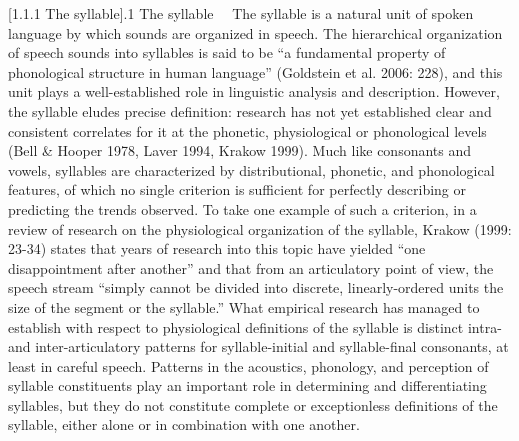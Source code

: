 \documentclass[12pt]{article}
\makeatletter
\renewcommand\section{\@startsection{section}{1}{0.0in}{0in}{0.1mm}{\normalfont\normalsize\fontsize{18pt}{21.6pt}\selectfont\rmfamily\bfseries\upshape\raggedright}}
\newenvironment{styleBody}{\renewcommand\baselinestretch{1.0}\setlength\leftskip{0in}\setlength\rightskip{0in plus 1fil}\setlength\parindent{0in}\setlength\parfillskip{0pt plus 1fil}\setlength\parskip{0in plus 1pt}\writerlistparindent\writerlistleftskip\leavevmode\normalfont\normalsize\fontsize{11pt}{13.2pt}\selectfont\mdseries\upshape\writerlistlabel\ignorespaces}{\unskip\vspace{0in plus 1pt}\par}
\newcommand\writerlistleftskip{}
\newcommand\writerlistparindent{}
\newcommand\writerlistlabel{}
\makeatother
\begin{document}
\section[1.1.1 The syllable]{.1 The syllable}
\begin{styleBody}
\ \ The syllable is a natural unit of spoken language by which sounds are organized in speech. The hierarchical organization of speech sounds into syllables is said to be “a fundamental property of phonological structure in human language” (Goldstein et al. 2006: 228), and this unit plays a well-established role in linguistic analysis and description. However, the syllable eludes precise definition: research has not yet established clear and consistent correlates for it at the phonetic, physiological or phonological levels (Bell \& Hooper 1978, Laver 1994, Krakow 1999). Much like consonants and vowels, syllables are characterized by distributional, phonetic, and phonological features, of which no single criterion is sufficient for perfectly describing or predicting the trends observed. To take one example of such a criterion, in a review of research on the physiological organization of the syllable, Krakow (1999: 23-34) states that years of research into this topic have yielded “one disappointment after another” and that from an articulatory point of view, the speech stream “simply cannot be divided into discrete, linearly-ordered units the size of the segment or the syllable.” What empirical research has managed to establish with respect to physiological definitions of the syllable is distinct intra- and inter-articulatory patterns for syllable-initial and syllable-final consonants, at least in careful speech. Patterns in the acoustics, phonology, and perception of syllable constituents play an important role in determining and differentiating syllables, but they do not constitute complete or exceptionless definitions of the syllable, either alone or in combination with one another.
\end{styleBody}
\end{document}
